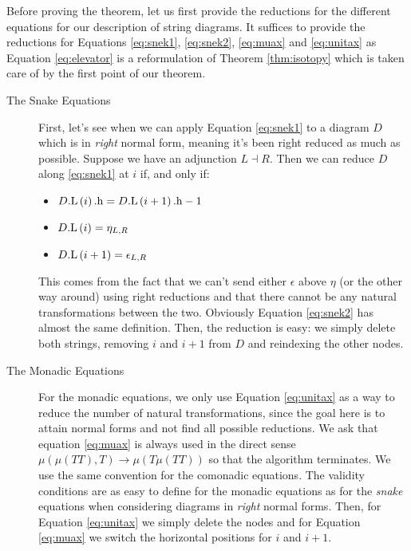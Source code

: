 Before proving the theorem, let us first provide the reductions for the different
equations for our description of string diagrams.
It suffices to provide the reductions for Equations \ref{eq:snek1}, \ref{eq:snek2},
\ref{eq:muax} and \ref{eq:unitax} as Equation \ref{eq:elevator} is a
reformulation of Theorem \ref{thm:isotopy} which is taken care of by the first
point of our theorem.
\begin{description}
	\item[The Snake Equations]
	      First, let's see when we can apply Equation \ref{eq:snek1} to a diagram $D$ which is in \emph{right} normal form, meaning it's been right reduced as much as possible.
	      Suppose we have an adjunction $L \dashv R$.
	      Then we can reduce $D$ along \eqref{eq:snek1} at $i$ if, and only if:
	      \begin{itemize}
		      \item $D\mathrm{.L}\left(i\right)\mathrm{.h} = D\mathrm{.L}\left(i + 1\right)\mathrm{.h} - 1$
		      \item $D\mathrm{.L}\left(i\right) = \eta_{L, R}$
		      \item $D\mathrm{.L}\left(i + 1\right) = \epsilon_{L, R}$
	      \end{itemize}
	      This comes from the fact that we can't send either $\epsilon$
	      above $\eta$ (or the other way around) using right reductions and
	      that there cannot be any natural transformations between the two.
	      Obviously Equation \ref{eq:snek2} has almost the same definition.
	      Then, the reduction is easy: we simply delete both strings,
	      removing $i$ and $i + 1$ from $D$ and reindexing the other nodes.
	\item[The Monadic Equations] For the monadic equations, we only use
	      Equation \ref{eq:unitax} as a way to reduce the number of natural
	      transformations, since the goal here is to attain normal forms
	      and not find all possible reductions.
	      We ask that equation \ref{eq:muax} is always used in the direct
	      sense $\mu\left( \mu\left( TT \right),T \right) \to \mu\left(
		      T\mu\left( TT \right) \right)$ so that the algorithm terminates.
	      We use the same convention for the comonadic equations.
	      The validity conditions are as easy to define for the monadic
	      equations as for the \emph{snake} equations when considering
	      diagrams in \emph{right} normal forms.
	      Then, for Equation \eqref{eq:unitax} we simply delete the nodes
	      and for Equation \eqref{eq:muax} we switch the horizontal
	      positions for $i$ and $i + 1$.
\end{description}

